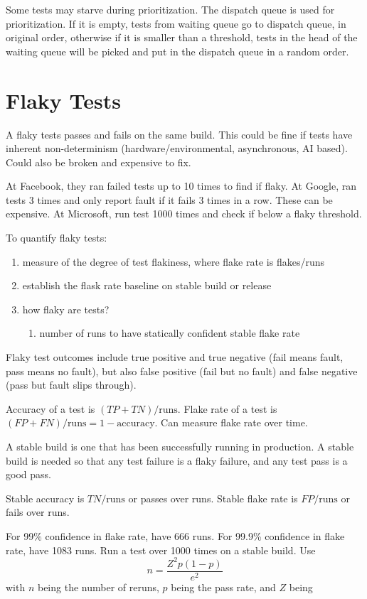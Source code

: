 \documentclass[11pt]{article}
\begin{document}
Some tests may starve during prioritization.
The dispatch queue is used for prioritization.
If it is empty, tests from waiting queue go to dispatch queue, in original order,
otherwise if it is smaller than a threshold, tests in the head of the waiting queue will be
picked and put in the dispatch queue in a random order.
\section{Flaky Tests}
\label{sec:org1c0cd80}
A flaky tests passes and fails on the same build.
This could be fine if tests have inherent non-determinism (hardware/environmental, asynchronous,
AI based).
Could also be broken and expensive to fix.

At Facebook, they ran failed tests up to 10 times to find if flaky.
At Google, ran tests 3 times and only report fault if it fails 3 times in a row.
These can be expensive.
At Microsoft, run test 1000 times and check if below a flaky threshold.

To quantify flaky tests:
\begin{enumerate}
\item measure of the degree of test flakiness, where flake rate is flakes/runs
\item establish the flask rate baseline on stable build or release
\item how flaky are tests?
\begin{enumerate}
\item number of runs to have statically confident stable flake rate
\end{enumerate}
\end{enumerate}

Flaky test outcomes include true positive and true negative (fail means fault, pass means no fault),
but also false positive (fail but no fault) and false negative (pass but fault slips through).

Accuracy of a test is \((TP + TN)/\text{runs}\).
Flake rate of a test is \((FP + FN)/\text{runs} = 1 - \text{accuracy}\).
Can measure flake rate over time.

A stable build is one that has been successfully running in production.
A stable build is needed so that any test failure is a flaky failure, and any test pass is a good pass.

Stable accuracy is \(TN/\text{runs}\) or passes over runs.
Stable flake rate is \(FP/\text{runs}\) or fails over runs.

For 99\% confidence in flake rate, have 666 runs.
For 99.9\% confidence in flake rate, have 1083 runs.
Run a test over 1000 times on a stable build.
Use
$$
n = \frac{Z^{2}p(1-p)}{e^{2}}
$$
with \(n\) being the number of reruns, \(p\) being the pass rate, and \(Z\) being
\end{document}
